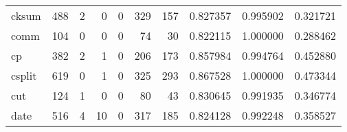 \begin{longtable}{lrrrrrrrrr}
cksum     &                                   488 &                                                  2 &                                                  0 &                                                  0 &                                                329 &                                                157 &                                           0.827357 &                               0.995902 &                             0.321721 \\
comm      &                                   104 &                                                  0 &                                                  0 &                                                  0 &                                                 74 &                                                 30 &                                           0.822115 &                               1.000000 &                             0.288462 \\
cp        &                                   382 &                                                  2 &                                                  1 &                                                  0 &                                                206 &                                                173 &                                           0.857984 &                               0.994764 &                             0.452880 \\
csplit    &                                   619 &                                                  0 &                                                  1 &                                                  0 &                                                325 &                                                293 &                                           0.867528 &                               1.000000 &                             0.473344 \\
cut       &                                   124 &                                                  1 &                                                  0 &                                                  0 &                                                 80 &                                                 43 &                                           0.830645 &                               0.991935 &                             0.346774 \\
date      &                                   516 &                                                  4 &                                                 10 &                                                  0 &                                                317 &                                                185 &                                           0.824128 &                               0.992248 &                             0.358527 \\

\end{longtable}
